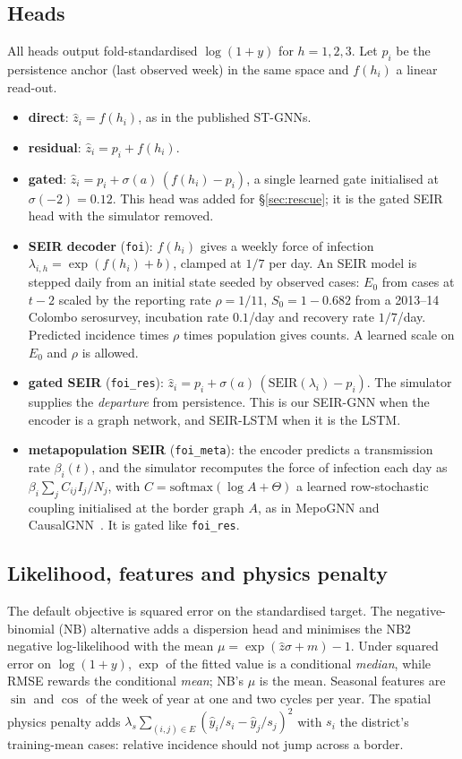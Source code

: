 \subsection{Heads}
All heads output fold-standardised $\log(1+y)$ for $h=1,2,3$. Let $p_i$ be the
persistence anchor (last observed week) in the same space and $f(h_i)$ a
linear read-out.
\begin{itemize}\itemsep1pt
\item \textbf{direct}: $\hat{z}_i = f(h_i)$, as in the published ST-GNNs.
\item \textbf{residual}: $\hat{z}_i = p_i + f(h_i)$.
\item \textbf{gated}: $\hat{z}_i = p_i + \sigma(a)\,(f(h_i) - p_i)$, a single
      learned gate initialised at $\sigma(-2)=0.12$. This head was added for
      \S\ref{sec:rescue}; it is the gated SEIR head with the simulator removed.
\item \textbf{SEIR decoder} (\texttt{foi}): $f(h_i)$ gives a weekly force of
      infection $\lambda_{i,h}=\exp(f(h_i)+b)$, clamped at $1/7$ per day. An
      SEIR model is stepped daily from an initial state seeded by observed
      cases: $E_0$ from cases at $t-2$ scaled by the reporting rate $\rho=1/11$,
      $S_0 = 1-0.682$ from a 2013--14 Colombo serosurvey, incubation rate
      $0.1$/day and recovery rate $1/7$/day. Predicted incidence times $\rho$
      times population gives counts. A learned scale on $E_0$ and $\rho$ is
      allowed.
\item \textbf{gated SEIR} (\texttt{foi\_res}): $\hat{z}_i = p_i +
      \sigma(a)\,(\mathrm{SEIR}(\lambda_i) - p_i)$. The simulator supplies the
      \emph{departure} from persistence. This is our SEIR-GNN when the encoder
      is a graph network, and SEIR-LSTM when it is the LSTM.
\item \textbf{metapopulation SEIR} (\texttt{foi\_meta}): the encoder predicts a
      transmission rate $\beta_i(t)$, and the simulator recomputes the force of
      infection each day as $\beta_i\sum_j C_{ij} I_j/N_j$, with
      $C=\mathrm{softmax}(\log A + \Theta)$ a learned row-stochastic coupling
      initialised at the border graph $A$, as in MepoGNN and
      CausalGNN~\cite{cao2023mepognn,wang2022causalgnn}. It is gated like
      \texttt{foi\_res}.
\end{itemize}

\subsection{Likelihood, features and physics penalty}
The default objective is squared error on the standardised target. The
negative-binomial (NB) alternative adds a dispersion head and minimises the NB2
negative log-likelihood with the mean $\mu = \exp(\hat z\sigma+m)-1$. Under
squared error on $\log(1+y)$, $\exp$ of the fitted value is a conditional
\emph{median}, while RMSE rewards the conditional \emph{mean}; NB's $\mu$ is the
mean. Seasonal features are $\sin$ and $\cos$ of the week of year at one and two
cycles per year. The spatial physics penalty adds
$\lambda_s\sum_{(i,j)\in E}(\hat y_i/s_i-\hat y_j/s_j)^2$ with $s_i$ the
district's training-mean cases: relative incidence should not jump across a
border.

